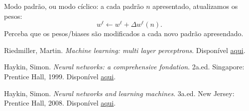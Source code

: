 \documentclass[12pt,a4paper]{article}
\begin{document}
Modo padrão, ou modo cíclico: a cada padrão $n$ apresentado, atualizamos os pesos:
\[
w^\ell \gets w^\ell + \Delta w^\ell(n).
\]
Perceba que os pesos/biases são modificados a cada novo padrão apresendado.
 
 
 
 
 


\begin{thebibliography}{9}	
Riedmiller, Martin. \textit{Machine learning: multi layer perceptrons}. Disponível \href{http://ml.informatik.uni-freiburg.de/former/_media/documents/teaching/ss09/ml/mlps.pdf}{aqui}.


Haykin, Simon. \textit{Neural networks: a comprehensive fondation}. 2a.ed. Singapore: Prentice Hall, 1999. 
Disponível \href{https://www.researchgate.net/profile/Ashraf_Khalaf3/post/Does_anyone_have_current_information_on_back-propagation_in_artificial_neural_networks/attachment/59d621a279197b8077980002/AS%3A297484992696331%401447937358281/download/Neural+Networks+-+A+Comprehensive+Foundation+-+Simon+Haykin.pdf}{aqui}.

Haykin, Simon. \textit{Neural networks and learning machines}. 3a.ed. New Jersey: Prentice Hall, 2008. Disponível 
\href{http://dai.fmph.uniba.sk/courses/NN/haykin.neural-networks.3ed.2009.pdf}{aqui}. 



\end{thebibliography}
\end{document}
